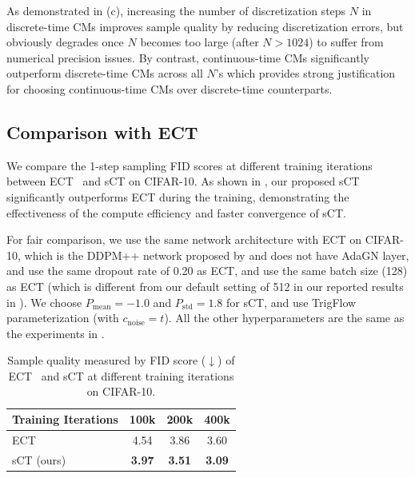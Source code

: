 As demonstrated in (c), increasing the number of discretization steps $N$ in discrete-time CMs improves sample quality by reducing discretization errors, but obviously degrades once $N$ becomes too large (after $N>1024$) to suffer from numerical precision issues. By contrast, continuous-time CMs significantly outperform discrete-time CMs across all $N$'s which provides strong justification for choosing continuous-time CMs over discrete-time counterparts. 


\subsection{Comparison with ECT}

We compare the 1-step sampling FID scores at different training iterations between ECT~\citep{geng2024ect} and sCT on CIFAR-10. As shown in , our proposed sCT significantly outperforms ECT during the training, demonstrating the effectiveness of the compute efficiency and faster convergence of sCT.

For fair comparison, we use the same network architecture with ECT on CIFAR-10, which is the DDPM++ network proposed by \citet{ho2020ddpm} and does not have AdaGN layer, and use the same dropout rate of 0.20 as ECT, and use the same batch size (128) as ECT (which is different from our default setting of 512 in our reported results in ). We choose $P_{\text{mean}}=-1.0$ and $P_{\text{std}}=1.8$ for sCT, and use TrigFlow parameterization (with $c_{\text{noise}}=t$). All the other hyperparameters are the same as the experiments in .

\begin{table}[ht]
    \centering
    \caption{\small{Sample quality measured by FID score ($\downarrow$) of ECT~\citep{geng2024ect} and sCT at different training iterations on CIFAR-10.}}
    \label{tab:appendix:result_ect}
    \small{
    \begin{tabular}{|l|ccc|} %
        \hline %
         Training Iterations & 100k & 200k & 400k \\
        \hline
        ECT & 4.54 & 3.86 & 3.60 \\
        \hline
        sCT (ours) & \textbf{3.97} & \textbf{3.51} & \textbf{3.09} \\
        \hline
        
    \end{tabular}%
    }
\end{table}

